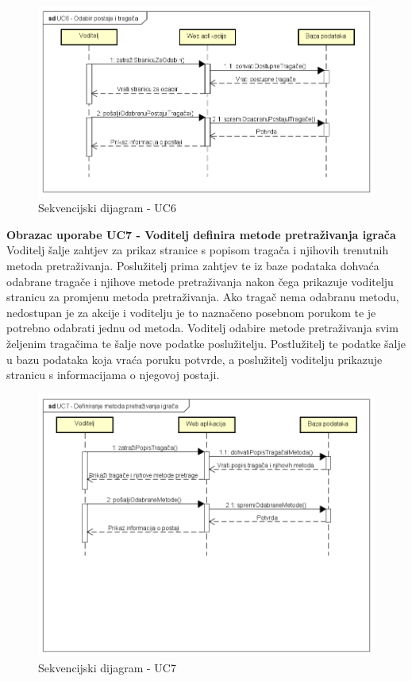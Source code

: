 				\begin{figure}[H]
					\includegraphics[scale=0.7]{slike/UC6_sekv.PNG} %
					\centering
					\caption{Sekvencijski dijagram - UC6}
					\label{fig:promjene}
				\end{figure}
				\eject
				
				\noindent \textbf{Obrazac uporabe UC7 - Voditelj definira metode pretraživanja igrača}\\
				
				\noindent Voditelj šalje zahtjev za prikaz stranice s popisom tragača i njihovih trenutnih metoda pretraživanja. Poslužitelj prima zahtjev te iz baze podataka dohvaća odabrane tragače i njihove metode pretraživanja nakon čega prikazuje voditelju stranicu za promjenu metoda pretraživanja. Ako tragač nema odabranu metodu, nedostupan je za akcije i voditelju je to naznačeno posebnom porukom te je potrebno odabrati jednu od metoda. Voditelj odabire metode pretraživanja svim željenim tragačima te šalje nove podatke poslužitelju. Postlužitelj te podatke šalje u bazu podataka koja vraća poruku potvrde, a poslužitelj voditelju prikazuje stranicu s informacijama o njegovoj postaji.
				
				\begin{figure}[H]
					\includegraphics[scale=0.7]{slike/UC7_sekv.PNG} %
					\centering
					\caption{Sekvencijski dijagram - UC7}
					\label{fig:promjene}
				\end{figure}
				\eject
				
